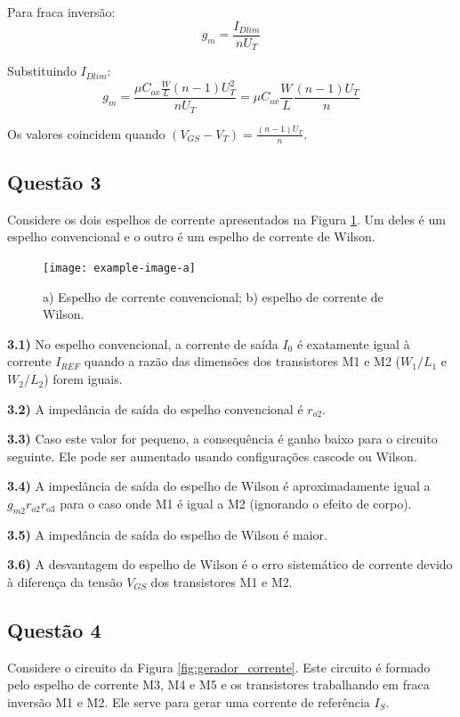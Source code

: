 \documentclass[12pt,a4paper]{article}
\begin{document}
Para fraca inversão:
$$g_m = \frac{I_{Dlim}}{nU_T}$$

Substituindo $I_{Dlim}$:
$$g_m = \frac{\mu C_{ox} \frac{W}{L} (n-1) U_T^2}{nU_T} = \mu C_{ox} \frac{W}{L} \frac{(n-1)U_T}{n}$$

Os valores coincidem quando $(V_{GS} - V_T) = \frac{(n-1)U_T}{n}$.

\subsection*{Questão 3}

Considere os dois espelhos de corrente apresentados na Figura \ref{fig:espelhos_corrente}. Um deles é um espelho convencional e o outro é um espelho de corrente de Wilson.

\begin{figure}[H]
    \centering
    \texttt{[image: example-image-a]}
    \caption{a) Espelho de corrente convencional; b) espelho de corrente de Wilson.}
    \label{fig:espelhos_corrente}
\end{figure}

\textbf{3.1)} No espelho convencional, a corrente de saída $I_0$ é exatamente igual à corrente $I_{REF}$ quando a razão das dimensões dos transistores M1 e M2 ($W_1/L_1$ e $W_2/L_2$) forem iguais.

\textbf{3.2)} A impedância de saída do espelho convencional é $r_{o2}$.

\textbf{3.3)} Caso este valor for pequeno, a consequência é ganho baixo para o circuito seguinte. Ele pode ser aumentado usando configurações cascode ou Wilson.

\textbf{3.4)} A impedância de saída do espelho de Wilson é aproximadamente igual a $g_{m2} r_{o2} r_{o3}$ para o caso onde M1 é igual a M2 (ignorando o efeito de corpo).

\textbf{3.5)} A impedância de saída do espelho de Wilson é maior.

\textbf{3.6)} A desvantagem do espelho de Wilson é o erro sistemático de corrente devido à diferença da tensão $V_{GS}$ dos transistores M1 e M2.

\subsection*{Questão 4}

Considere o circuito da Figura \ref{fig:gerador_corrente}. Este circuito é formado pelo espelho de corrente M3, M4 e M5 e os transistores trabalhando em fraca inversão M1 e M2. Ele serve para gerar uma corrente de referência $I_S$.
\end{document}
